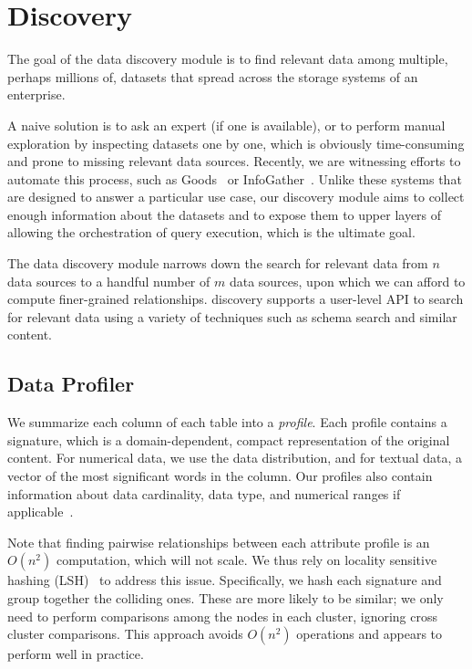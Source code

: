 \section{Discovery}
\label{sec:discovery}

The goal of the data discovery module is to find relevant data among multiple,
perhaps millions of, datasets that spread across the storage systems of an
enterprise.

A naive solution is to ask an expert (if one is available), or to perform
manual exploration by inspecting datasets one by one, which is obviously
time-consuming and prone to missing relevant data sources.  Recently, we are
witnessing efforts to automate this process, such as
Goods~\cite{DBLP:conf/sigmod/HalevyKNOPRW16} or
InfoGather~\cite{DBLP:conf/sigmod/YakoutGCC12}. Unlike these systems
that are designed to answer a particular use case, our discovery module aims to
collect enough information about the datasets and to expose them to upper layers
of \dcv allowing the orchestration of query execution, which is the ultimate
goal.

The data discovery module narrows down the search for relevant data from
$n$ data sources to a handful number of $m$ data sources, upon which we can afford to compute finer-grained relationships.
\dcv discovery supports a user-level API to search for relevant data using a
variety of techniques such as schema search and similar content. 

\subsection{Data Profiler}

We summarize each column of each table into a {\em profile}. Each profile contains a signature, which is a domain-dependent,
compact representation of the original content.  For numerical data, we use the
data distribution, and for textual data,  a vector of the most significant words
in the column.  Our profiles also contain information about data cardinality,
data type, and numerical ranges if applicable~\cite{profiling_survey}.

Note that finding pairwise relationships between each attribute profile is an $O(n^2)$ computation, which will not scale.  
We thus rely on locality sensitive hashing
(LSH)~\cite{DBLP:conf/compgeom/DatarIIM04} to address this issue. Specifically,
we hash each signature and group together the colliding ones. %
These are more likely to be similar; we only need to perform comparisons among the nodes in
each cluster, ignoring cross cluster comparisons.  This approach avoids $O(n^2)$
operations and appears to perform well in practice.

